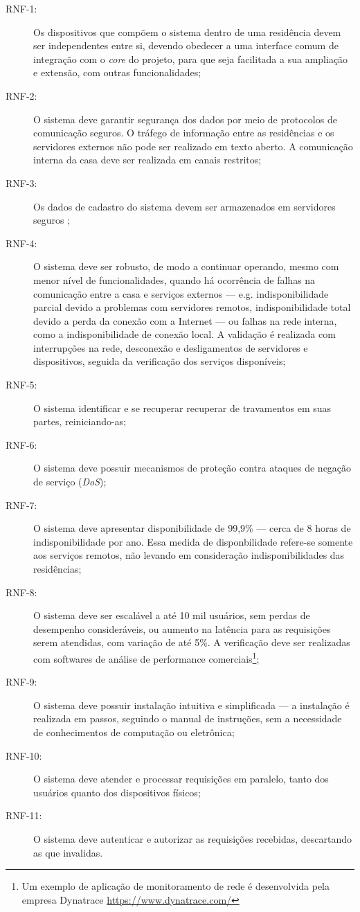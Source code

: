 \begin{description}
\item[RNF-1:]  Os dispositivos que compõem o sistema dentro de uma residência devem ser independentes entre si, devendo obedecer a uma interface comum de integração com o \emph{core} do projeto, para que seja facilitada a sua ampliação e extensão, com outras funcionalidades;
\item[RNF-2:]  O sistema deve garantir segurança dos dados por meio de protocolos de comunicação seguros. O tráfego de informação entre as residências e os servidores externos não pode ser realizado em texto aberto. A comunicação interna da casa deve ser realizada em canais restritos;
\item[RNF-3:]  Os dados de cadastro do sistema devem ser armazenados em servidores seguros \cite{softwareSecurity};
\item[RNF-4:]  O sistema deve ser robusto, de modo a continuar operando, mesmo com menor nível de funcionalidades, quando há ocorrência de falhas na comunicação entre a casa e serviços externos --- e.g. indisponibilidade parcial devido a problemas com servidores remotos, indisponibilidade total devido a perda da conexão com a Internet --- ou falhas na rede interna, como a indisponibilidade de conexão local. A validação é realizada com interrupções na rede, desconexão e desligamentos de servidores e dispositivos, seguida da verificação dos serviços disponíveis;
\item[RNF-5:] O sistema identificar e se recuperar recuperar de travamentos em suas partes, reiniciando-as;
\item[RNF-6:] O sistema deve possuir mecanismos de proteção contra ataques de negação de serviço (\emph{DoS});
\item[RNF-7:]  O sistema deve apresentar disponibilidade de 99,9\% --- cerca de 8 horas de indisponibilidade por ano. Essa medida de disponbilidade refere-se somente aos serviços remotos, não levando em consideração indisponibilidades das residências;
\item[RNF-8:]  O sistema deve ser escalável a até 10 mil usuários, sem perdas de desempenho consideráveis, ou aumento na latência para as requisições serem atendidas, com variação de até 5\%. A verificação deve ser realizadas com softwares de análise de performance comerciais\footnote{Um exemplo de aplicação de monitoramento de rede é desenvolvida pela empresa Dynatrace \url{https://www.dynatrace.com/}};
\item[RNF-9:]  O sistema deve possuir instalação intuitiva e simplificada --- a instalação é realizada em passos, seguindo o manual de instruções, sem a necessidade de conhecimentos de computação ou eletrônica;
\item[RNF-10:] O sistema deve atender e processar requisições em paralelo, tanto dos usuários quanto dos dispositivos físicos;
\item[RNF-11:] O sistema deve autenticar e autorizar as requisições recebidas, descartando as que invalidas. 
\end{description}

